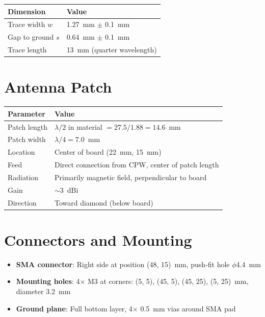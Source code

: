 \documentclass[11pt,a4paper,openany]{book}
\begin{document}

\begin{center}
\begin{tabular}{ll}
\toprule
\textbf{Dimension} & \textbf{Value} \\
\midrule
Trace width $w$ & 1.27~mm $\pm$ 0.1~mm \\
Gap to ground $s$ & 0.64~mm $\pm$ 0.1~mm \\
Trace length & 13~mm (quarter wavelength) \\
\bottomrule
\end{tabular}
\end{center}

\section{Antenna Patch}

\begin{center}
\begin{tabular}{ll}
\toprule
\textbf{Parameter} & \textbf{Value} \\
\midrule
Patch length & $\lambda/2$ in material $= 27.5/1.88 = 14.6$~mm \\
Patch width & $\lambda/4 = 7.0$~mm \\
Location & Center of board (22~mm, 15~mm) \\
Feed & Direct connection from CPW, center of patch length \\
Radiation & Primarily magnetic field, perpendicular to board \\
Gain & ${\sim}3$~dBi \\
Direction & Toward diamond (below board) \\
\bottomrule
\end{tabular}
\end{center}

\section{Connectors and Mounting}

\begin{itemize}[nosep]
  \item \textbf{SMA connector}: Right side at position (48, 15)~mm, push-fit hole $\phi$4.4~mm
  \item \textbf{Mounting holes}: 4$\times$ M3 at corners: (5, 5), (45, 5), (45, 25), (5, 25)~mm, diameter 3.2~mm
  \item \textbf{Ground plane}: Full bottom layer, 4$\times$ 0.5~mm vias around SMA pad
\end{itemize}
\end{document}
